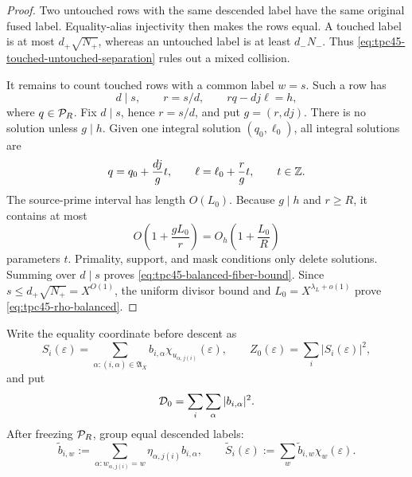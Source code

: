 \begin{proof}
Two untouched rows with the same descended label have the same original
fused label.  Equality-alias injectivity then makes the rows equal.  A
touched label is at most \(d_+\sqrt{N_+}\), whereas an untouched label
is at least \(d_-N_-\).  Thus
\eqref{eq:tpc45-touched-untouched-separation} rules out a mixed
collision.

It remains to count touched rows with a common label \(w=s\).  Such a
row has
\begin{equation}
 d\mid s,\qquad r=s/d,\qquad rq-dj\ell=h,
 \label{eq:tpc45-common-s-equation}
\end{equation}
where \(q\in\mathcal P_R\).  Fix \(d\mid s\), hence \(r=s/d\), and put
\(g=(r,dj)\).  There is no solution unless \(g\mid h\).  Given one
integral solution \((q_0,\ell_0)\), all integral solutions are
\begin{equation}
 q=q_0+\frac{dj}{g}t,
 \qquad
 \ell=\ell_0+\frac r g t,
 \qquad t\in\mathbb Z.
 \label{eq:tpc45-ladder-parametrization-balanced}
\end{equation}
The source-prime interval has length \(O(L_0)\).  Because \(g\mid h\)
and \(r\ge R\), it contains at most
\begin{equation}
 O\!\left(1+\frac{gL_0}{r}\right)
 =O_h\!\left(1+\frac{L_0}{R}\right)
 \label{eq:tpc45-balanced-t-count}
\end{equation}
parameters \(t\).  Primality, support, and mask conditions only delete
solutions.  Summing over \(d\mid s\) proves
\eqref{eq:tpc45-balanced-fiber-bound}.  Since
\(s\le d_+\sqrt{N_+}=X^{O(1)}\), the uniform divisor bound and
\(L_0=X^{\lambda_L+o(1)}\) prove
\eqref{eq:tpc45-rho-balanced}.
\end{proof}

Write the equality coordinate before descent as
\begin{equation}
 S_i(\varepsilon)=
 \sum_{\alpha:(i,\alpha)\in\mathfrak A_X}
 b_{i,\alpha}\chi_{u_{\alpha,j(i)}}(\varepsilon),
 \qquad
 Z_0(\varepsilon)=\sum_i|S_i(\varepsilon)|^2,
 \label{eq:tpc45-coordinate-before-grouping}
\end{equation}
and put
\begin{equation}
 \mathcal D_0=\sum_i\sum_\alpha|b_{i,\alpha}|^2.
 \label{eq:tpc45-original-diagonal}
\end{equation}
After freezing \(\mathcal P_R\), group equal descended labels:
\begin{equation}
 \widetilde b_{i,w}
 :=\sum_{\alpha:w_{\alpha,j(i)}=w}
   \eta_{\alpha,j(i)}b_{i,\alpha},
 \qquad
 \widetilde S_i(\varepsilon)
 :=\sum_w\widetilde b_{i,w}\chi_w(\varepsilon).
 \label{eq:tpc45-grouped-coefficients}
\end{equation}

